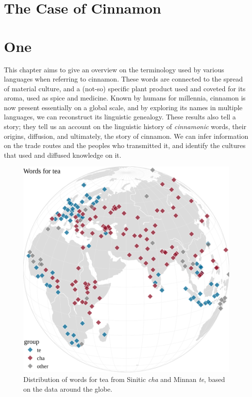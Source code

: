 


\section{The Case of Cinnamon}
\label{ch:cinnamon}

\section{One}


This chapter aims to give an overview on the terminology used by various languages when referring to cinnamon. These words are connected to the spread of material culture, and a (not-so) specific plant product used and coveted for its aroma, used as spice and medicine. Known by humans for millennia, cinnamon is now present essentially on a global scale, and by exploring its names in multiple languages, we can reconstruct its linguistic genealogy. These results also tell a story; they tell us an account on the linguistic history of \emph{cinnamonic} words, their origins, diffusion, and ultimately, the story of cinnamon. We can infer information on the trade routes and the peoples who transmitted it, and identify the cultures that used and diffused knowledge on it. 

\begin{figure}[ht!]
    \centering
    \includegraphics[width=\linewidth]{imgs/plots/distribution_tea.pdf}
    \caption{Distribution of words for tea from Sinitic \textit{cha} and Minnan \textit{te}, based on the data around the globe.}
    \label{fig:distribution_tea}
\end{figure}

